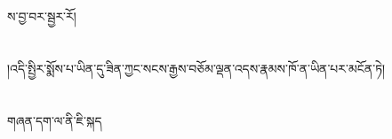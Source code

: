 ས་བྱ་བར་སྦྱར་རོ།\chapter{ }།འདི་སྤྱིར་སྨོས་པ་ཡིན་དུ་ཟིན་ཀྱང་སངས་རྒྱས་བཅོམ་ལྡན་འདས་རྣམས་ཁོ་ན་ཡིན་པར་མངོན་ཏེ།\chapter{ }གཞན་དག་ལ་ནི་ཇི་སྐད